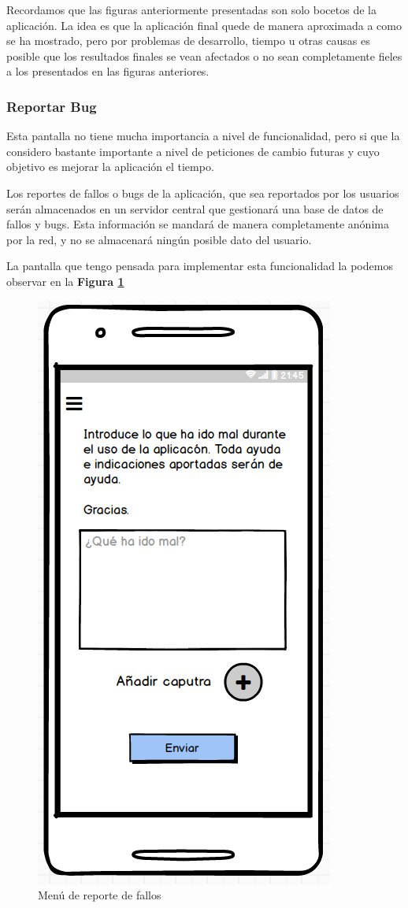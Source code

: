 Recordamos que las figuras anteriormente presentadas son solo bocetos de la aplicación. La idea es que la aplicación final quede de manera aproximada a como se ha mostrado, pero por problemas de desarrollo, tiempo u otras causas es posible que los resultados finales se vean afectados o no sean completamente fieles a los presentados en las figuras anteriores. 

\subsubsection*{Reportar Bug}

Esta pantalla no tiene mucha importancia a nivel de funcionalidad, pero si que la considero bastante importante a nivel de peticiones de cambio futuras y cuyo objetivo es mejorar la aplicación el tiempo. 

Los reportes de fallos o bugs de la aplicación, que sea reportados por los usuarios serán almacenados en un servidor central que gestionará una base de datos de fallos y bugs. Esta información se mandará de manera completamente anónima por la red, y no se almacenará ningún posible dato del usuario. 

La pantalla que tengo pensada para implementar esta funcionalidad la podemos observar en la \textbf{Figura \ref{fig:bugreport}}

\begin{figure}[H]
\centering
\includegraphics[scale=0.6]{imagenes/diseno/bugreport.png}
\caption{Menú de reporte de fallos}
\label{fig:bugreport}
\end{figure}
